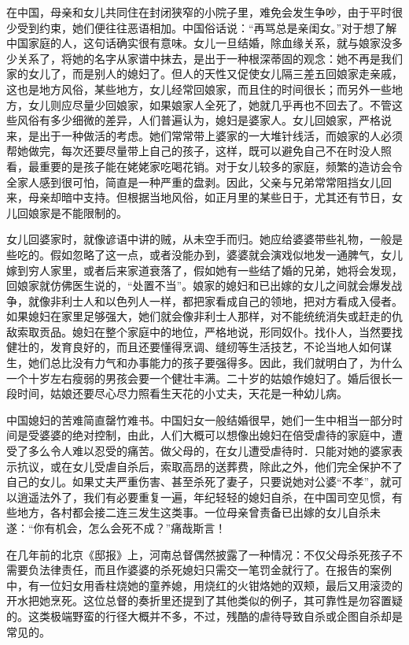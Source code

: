 \documentclass[12pt,oneside]{book}
\begin{document}
\begin{common-format}
在中国，母亲和女儿共同住在封闭狭窄的小院子里，难免会发生争吵，由于平时很少受到约束，她们便往往恶语相加。中国俗话说：“再骂总是亲闺女。”对于想了解中国家庭的人，这句话确实很有意味。女儿一旦结婚，除血缘关系，就与娘家没多少关系了，将她的名字从家谱中抹去，是出于一种根深蒂固的观念：她不再是我们家的女儿了，而是别人的媳妇了。但人的天性又促使女儿隔三差五回娘家走亲戚，这也是地方风俗，某些地方，女儿经常回娘家，而且住的时间很长；而另外一些地方，女儿则应尽量少回娘家，如果娘家人全死了，她就几乎再也不回去了。不管这些风俗有多少细微的差异，人们普遍认为，媳妇是婆家人。女儿回娘家，严格说来，是出于一种做活的考虑。她们常常带上婆家的一大堆针线活，而娘家的人必须帮她做完，每次还要尽量带上自己的孩子，这样，既可以避免自己不在时没人照看，最重要的是孩子能在姥姥家吃喝花销。对于女儿较多的家庭，频繁的造访会令全家人感到很可怕，简直是一种严重的盘剥。因此，父亲与兄弟常常阻挡女儿回来，母亲却暗中支持。但根据当地风俗，如正月里的某些日于，尤其还有节日，女儿回娘家是不能限制的。 

女儿回婆家时，就像谚语中讲的贼，从未空手而归。她应给婆婆带些礼物，一般是些吃的。假如忽略了这一点，或者没能办到，婆婆就会演戏似地发一通脾气，女儿嫁到穷人家里，或者后来家道衰落了，假如她有一些结了婚的兄弟，她将会发现，回娘家就仿佛医生说的，“处置不当”。娘家的媳妇和已出嫁的女儿之间就会爆发战争，就像非利士人和以色列人一样，都把家看成自己的领地，把对方看成入侵者。如果媳妇在家里足够强大，她们就会像非利士人那样，对不能统统消失或赶走的仇敌索取贡品。媳妇在整个家庭中的地位，严格地说，形同奴仆。找仆人，当然要找健壮的，发育良好的，而且还要懂得烹调、缝纫等生活技艺，不论当地人如何谋生，她们总比没有力气和办事能力的孩子要强得多。因此，我们就明白了，为什么一个十岁左右瘦弱的男孩会要一个健壮丰满。二十岁的姑娘作媳妇了。婚后很长一段时间，姑娘还要尽心尽力照看生天花的小丈夫，天花是一种幼儿病。 

中国媳妇的苦难简直罄竹难书。中国妇女一般结婚很早，她们一生中相当一部分时间是受婆婆的绝对控制，由此，人们大概可以想像出媳妇在倍受虐待的家庭中，遭受了多么令人难以忍受的痛苦。做父母的，在女儿遭受虐待时．只能对她的婆家表示抗议，或在女儿受虐自杀后，索取高昂的送葬费，除此之外，他们完全保护不了自己的女儿。如果丈夫严重伤害、甚至杀死了妻子，只要说她对公婆“不孝”，就可以逍遥法外了，我们有必要重复一遍，年纪轻轻的媳妇自杀，在中国司空见惯，有些地方，各村都会接二连三发生这类事。一位母亲曾责备已出嫁的女儿自杀未遂：“你有机会，怎么会死不成？”痛哉斯言！ 

在几年前的北京《邸报》上，河南总督偶然披露了一种情况：不仅父母杀死孩子不需要负法律责任，而且作婆婆的杀死媳妇只需交一笔罚金就行了。在报告的案例中，有一位妇女用香柱烧她的童养媳，用烧红的火钳烙她的双颊，最后又用滚烫的开水把她烹死。这位总督的奏折里还提到了其他类似的例子，其可靠性是勿容置疑的。这类极端野蛮的行径大概并不多，不过，残酷的虐待导致自杀或企图自杀却是常见的。 


\end{common-format}
\end{document}
